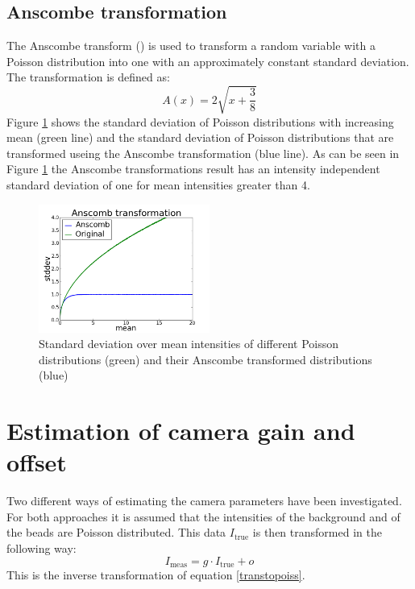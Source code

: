\subsection{Anscombe transformation}
\label{trafoAnscombe}
The Anscombe transform (\cite{anscombe}) is used to transform a random variable with a Poisson
distribution into one with an approximately constant standard deviation. The
transformation is defined as:
\begin{equation}
	A(x) = 2\sqrt{x+\frac{3}{8}}
\end{equation}
Figure \ref{anscombe} shows the standard deviation of Poisson distributions with increasing mean (green line) and the standard deviation of Poisson distributions that are transformed useing the Anscombe transformation (blue line). As can be seen in Figure \ref{anscombe} the Anscombe transformations result has
an intensity independent standard deviation of one for mean intensities greater than 4.
\begin{figure}
	\centering
	\includegraphics[width = 0.5\textwidth]{pictures/anscombe.png}
	\caption{Standard deviation over mean intensities of different Poisson
	distributions (green) and their Anscombe transformed distributions (blue)}
	\label{anscombe}	
\end{figure}
 

\section{Estimation of camera gain and offset}\label{estimationCameraGain}
Two different ways of estimating the camera parameters have been investigated. For both approaches it is assumed that the intensities of the background and of the beads are Poisson distributed. This data $I_\text{true}$ is then transformed in the following way:
\begin{equation}
	I_\text{meas} = g \cdot I_\text{true} + o \label{trafoGain}
\end{equation}
This is the inverse transformation of equation \ref{transtopoiss}.
